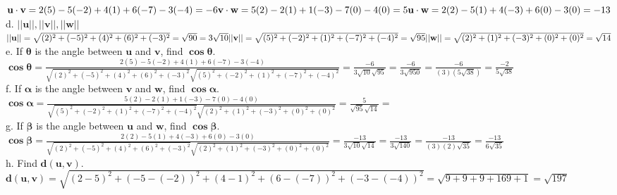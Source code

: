 \documentclass[11pt]{article}
\begin{document}
$
\textbf{u}\cdot\textbf{v} =
2(5)-5(-2)+4(1)+6(-7)-3(-4) = -6\\
\textbf{v}\cdot\textbf{w} = 5(2)-2(1)+1(-3)-7(0)-4(0) = 5\\
\textbf{u}\cdot\textbf{w} = 2(2)-5(1)+4(-3)+6(0)-3(0) = -13
$ \\[5pt]

d. $||\textbf{u}||,||\textbf{v}||,||\textbf{w}||$ \\[5pt]

$
||\textbf{u}|| =
\sqrt{(2)^2+(-5)^2+(4)^2+(6)^2+(-3)^2} = \sqrt{90} = 3\sqrt{10} \\
||\textbf{v}|| = 
\sqrt{(5)^2+(-2)^2+(1)^2+(-7)^2+(-4)^2}= \sqrt{95} \\
||\textbf{w}|| = 
\sqrt{(2)^2+(1)^2+(-3)^2+(0)^2+(0)^2} = \sqrt{14}
$ \\[5pt]

e. If $\mathbf{\theta}$ is the angle between $\mathbf{u}$ and $\mathbf{v}$, find $\mathbf{\cos \theta}$. \\[5pt]

$
\mathbf{\cos \theta}
= \frac{2(5)-5(-2)+4(1)+6(-7)-3(-4)}{\sqrt{(2)^2+(-5)^2+(4)^2+(6)^2+(-3)^2}\sqrt{(5)^2+(-2)^2+(1)^2+(-7)^2+(-4)^2}}
= \frac{-6}{3\sqrt{10} \sqrt{95}}
= \frac{-6}{3\sqrt{950}}
= \frac{-6}{(3) (5\sqrt{38})}
= \frac{-2}{5\sqrt{38}}
$ \\[5pt]

f. If $\mathbf{\alpha}$ is the angle between $\mathbf{v}$ and $\mathbf{w}$, find $\mathbf{\cos \alpha}$. \\[5pt]

$
\mathbf{\cos \alpha}
= \frac{5(2)-2(1)+1(-3)-7(0)-4(0)}{\sqrt{(5)^2+(-2)^2+(1)^2+(-7)^2+(-4)^2}\sqrt{(2)^2+(1)^2+(-3)^2+(0)^2+(0)^2}}
= \frac{5}{\sqrt{95} \sqrt{14}}
=
$ \\[5pt]

g. If $\mathbf{\beta}$ is the angle between $\mathbf{u}$ and $\mathbf{w}$, find $\mathbf{\cos \beta}$. \\[5pt]

$
\mathbf{\cos \beta}
= \frac{2(2)-5(1)+4(-3)+6(0)-3(0)}{\sqrt{(2)^2+(-5)^2+(4)^2+(6)^2+(-3)^2}\sqrt{(2)^2+(1)^2+(-3)^2+(0)^2+(0)^2}}
= \frac{-13}{3\sqrt{10} \sqrt{14}}
= \frac{-13}{3\sqrt{140}}
= \frac{-13}{(3)(2)\sqrt{35}}
= \frac{-13}{6\sqrt{35}}
$ \\[5pt]

h. Find $\mathbf{d(u,v)}$. \\[5pt]

$
\mathbf{d(u,v)}
= \sqrt{(2-5)^2 + (-5-(-2))^2 + (4-1)^2 + (6-(-7))^2 + (-3-(-4))^2}
= \sqrt{9 + 9 + 9 + 169 + 1}
= \sqrt{197}
$ \\[5pt]
\end{document}
